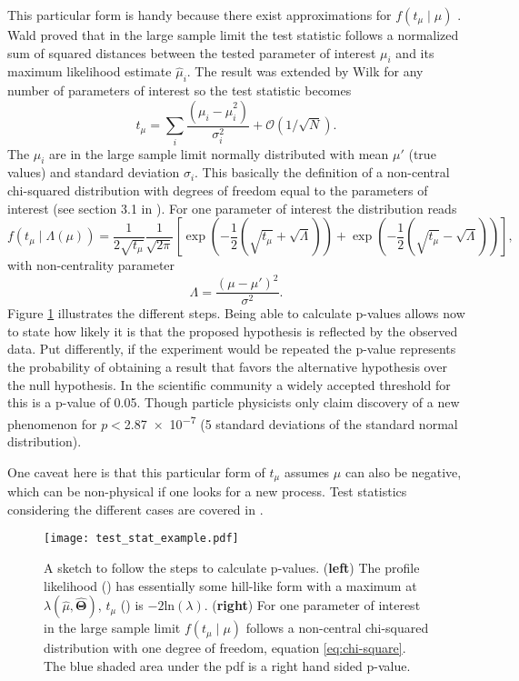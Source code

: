This particular form is handy because there exist approximations for $f(t_\mu \mid \mu)$ \citep{cowan2011asymptotic}. Wald \citep{wald1943tests} proved that in the large sample limit the test statistic follows a normalized sum of squared distances between the tested parameter of interest $\mu_i$ and its maximum likelihood estimate $\hat{\mu}_i$. The result was extended by Wilk \citep{wilks1938large} for any number of parameters of interest so the test statistic becomes
\begin{equation}
    t_\mu=\sum_i \frac{(\mu_i-\hat{\mu}_i^2)}{\sigma_i^2} + \mathcal{O}(1/\sqrt{N}).
\end{equation}
The $\hat{\mu}_i$ are in the large sample limit normally distributed with mean $\mu'$ (true values) and standard deviation $\sigma_i$. This basically the definition of a non-central chi-squared distribution with degrees of freedom equal to the parameters of interest (see section 3.1 in \citep{cowan2011asymptotic}). For one parameter of interest the distribution reads
\begin{equation}\label{eq:chi-square}
    f(t_\mu \mid \Lambda(\mu))=\frac{1}{2\sqrt{t_\mu}}\frac{1}{\sqrt{2\pi}}
    \left[
\exp\left(-\frac{1}{2}\left(\sqrt{t_\mu}+\sqrt{\Lambda}\right)\right)
+
\exp\left(-\frac{1}{2}\left(\sqrt{t_\mu}-\sqrt{\Lambda}\right)\right)
\right],
\end{equation}
with non-centrality parameter 
\begin{equation}
    \Lambda=\frac{(\mu-\mu')^2}{\sigma^2}.
\end{equation}
Figure \ref{fig:test_stat_example} illustrates the different steps. Being able to calculate p-values allows now to state how likely it is that the proposed hypothesis is reflected by the observed data. Put differently, if the experiment would be repeated the p-value represents the probability of obtaining a result that favors the alternative hypothesis over the null hypothesis. In the scientific community a widely accepted threshold for this is a p-value of 0.05. Though particle physicists only claim discovery of a new phenomenon for $p<$\SI{2.87e-7}{} (5 standard deviations of the standard normal distribution).

One caveat here is that this particular form of $t_\mu$ assumes $\mu$ can also be negative, which can be non-physical if one looks for a new process. Test statistics considering the different cases are covered in \citep{cowan2011asymptotic}. 
\begin{figure}
    \centering
    \texttt{[image: test\_stat\_example.pdf]}
        \caption[]{A sketch to follow the steps to calculate p-values. (\textbf{left}) The profile likelihood () has essentially some hill-like form with a maximum at ${\lambda(\hat{\mu},\hat{\bm{\Theta}})}$, $t_\mu$ () is $-2\mathrm{ln}(\lambda)$. (\textbf{right}) For one parameter of interest in the large sample limit $f(t_\mu \mid \mu)$ follows a non-central chi-squared distribution with one degree of freedom, equation \ref{eq:chi-square}. The blue shaded area under the pdf is a right hand sided p-value.}
    \label{fig:test_stat_example}    
\end{figure}

